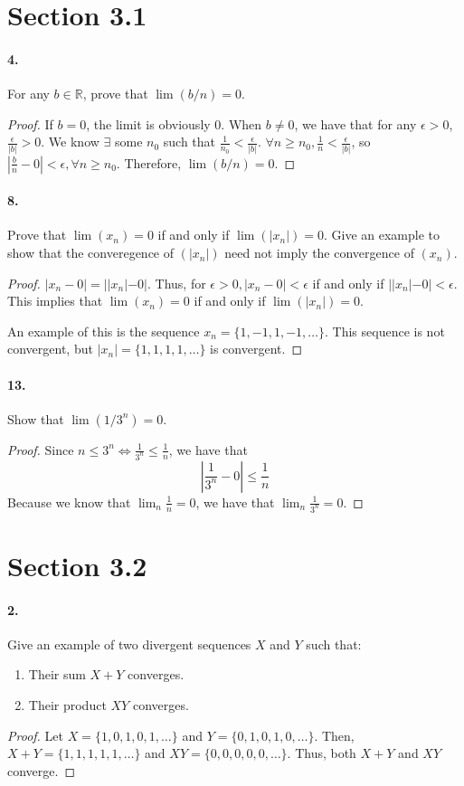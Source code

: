 \documentclass[12pt]{article}
\newcommand\R{\mathbb{R}}
\theoremstyle{remark}
\begin{document}
\section*{Section 3.1}
\paragraph{4.} For any $b \in \R$, prove that $\lim(b / n) = 0$. 
\begin{proof}
    If $b = 0$, the limit is obviously 0. When $b \neq 0$, we have that for any $\epsilon > 0$, $\frac{\epsilon}{|b|} > 0$. We know $\exists$ some $n_0$ such that $\frac{1}{n_0} < \frac{\epsilon}{|b|}$. $\forall n \geq n_0, \frac{1}{n} < \frac{\epsilon}{|b|}$, so $|\frac{b}{n} - 0| < \epsilon, \forall n \geq n_0$. Therefore, $\lim(b / n) = 0$.
\end{proof}

\paragraph{8.} Prove that $\lim(x_n) = 0$ if and only if $\lim(|x_n|) = 0$. Give an example to show that the converegence of $(|x_n|)$ need not imply the convergence of $(x_n)$. 
\begin{proof}
    $|x_n - 0| = ||x_n| - 0|$. Thus, for $\epsilon > 0, |x_n - 0| < \epsilon$ if and only if $||x_n| - 0| < \epsilon$. This implies that $\lim(x_n) = 0$ if and only if $\lim(|x_n|) = 0$.

    An example of this is the sequence $x_n = \{1, -1, 1, -1, \dots\}$. This sequence is not convergent, but $|x_n| = \{1, 1, 1, 1, \dots\}$ is convergent.
\end{proof}

\paragraph{13.} Show that $\lim(1/3^n) = 0$. 
\begin{proof}
    Since $n \leq 3^n \iff \frac{1}{3^n} \leq \frac{1}{n}$, we have that $$ |\frac{1}{3^n} - 0| \leq \frac{1}{n} $$ Because we know that $\lim_n \frac{1}{n} = 0$, we have that $\lim_n \frac{1}{3^n} = 0$.
\end{proof}

\section*{Section 3.2}
\paragraph{2.} Give an example of two divergent sequences $X$ and $Y$ such that:
\begin{enumerate}[label=(\alph*)]
    \item Their sum $X + Y$ converges.
    \item Their product $XY$ converges. 
\end{enumerate}
\begin{proof}
    Let $X = \{ 1, 0, 1, 0, 1, \ldots \}$ and $Y = \{ 0, 1, 0, 1, 0, \ldots \}$. Then, $X + Y = \{ 1, 1, 1, 1, 1, \ldots \}$ and $XY = \{ 0, 0, 0, 0, 0, \ldots \}$. Thus, both $X + Y$ and $XY$ converge.
\end{proof}
\end{document}
